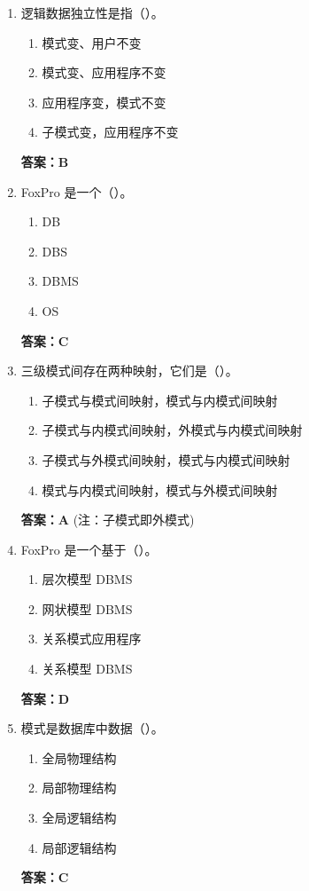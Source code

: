 \documentclass[12pt, a4paper]{article}
\begin{document}
\begin{enumerate}[label=\arabic*.]
    \item 逻辑数据独立性是指（\quad）。
    \begin{enumerate}
        \item 模式变、用户不变
        \item 模式变、应用程序不变
        \item 应用程序变，模式不变
        \item 子模式变，应用程序不变
    \end{enumerate}
    \textbf{答案：B}

    \item FoxPro 是一个（\quad）。
    \begin{enumerate}
        \item DB
        \item DBS
        \item DBMS
        \item OS
    \end{enumerate}
    \textbf{答案：C}

    \item 三级模式间存在两种映射，它们是（\quad）。
    \begin{enumerate}
        \item 子模式与模式间映射，模式与内模式间映射
        \item 子模式与内模式间映射，外模式与内模式间映射
        \item 子模式与外模式间映射，模式与内模式间映射
        \item 模式与内模式间映射，模式与外模式间映射
    \end{enumerate}
    \textbf{答案：A} (注：子模式即外模式)

    \item FoxPro 是一个基于（\quad）。
    \begin{enumerate}
        \item 层次模型 DBMS
        \item 网状模型 DBMS
        \item 关系模式应用程序
        \item 关系模型 DBMS
    \end{enumerate}
    \textbf{答案：D}

    \item 模式是数据库中数据（\quad）。
    \begin{enumerate}
        \item 全局物理结构
        \item 局部物理结构
        \item 全局逻辑结构
        \item 局部逻辑结构
    \end{enumerate}
    \textbf{答案：C}


\end{enumerate}
\end{document}
